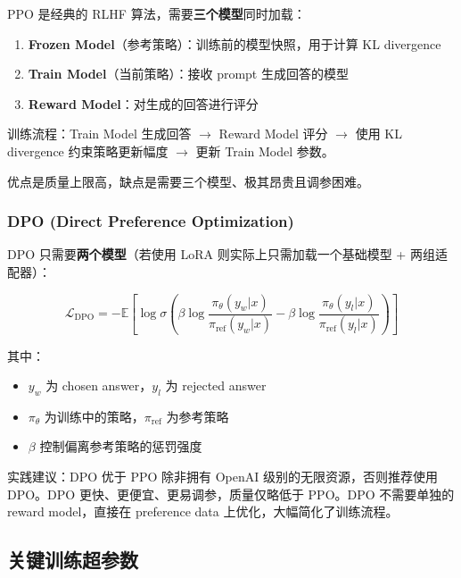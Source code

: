 \documentclass[a4paper]{article}
\begin{document}
PPO 是经典的 RLHF 算法，需要\textbf{三个模型}同时加载：

\begin{enumerate}
    \item \textbf{Frozen Model}（参考策略）：训练前的模型快照，用于计算 KL divergence
    \item \textbf{Train Model}（当前策略）：接收 prompt 生成回答的模型
    \item \textbf{Reward Model}：对生成的回答进行评分
\end{enumerate}

训练流程：Train Model 生成回答 $\rightarrow$ Reward Model 评分 $\rightarrow$ 使用 KL divergence 约束策略更新幅度 $\rightarrow$ 更新 Train Model 参数。

优点是质量上限高，缺点是需要三个模型、极其昂贵且调参困难。

\subsubsection{DPO (Direct Preference Optimization)}

DPO 只需要\textbf{两个模型}（若使用 LoRA 则实际上只需加载一个基础模型 + 两组适配器）：

$$\mathcal{L}_{\text{DPO}} = -\mathbb{E}\left[\log \sigma\left(\beta \log \frac{\pi_\theta(y_w|x)}{\pi_{\text{ref}}(y_w|x)} - \beta \log \frac{\pi_\theta(y_l|x)}{\pi_{\text{ref}}(y_l|x)}\right)\right]$$

其中：
\begin{itemize}
    \item $y_w$ 为 chosen answer，$y_l$ 为 rejected answer
    \item $\pi_\theta$ 为训练中的策略，$\pi_{\text{ref}}$ 为参考策略
    \item $\beta$ 控制偏离参考策略的惩罚强度
\end{itemize}

\begin{importantbox}{实践建议：DPO 优于 PPO}
除非拥有 OpenAI 级别的无限资源，否则推荐使用 DPO。DPO 更快、更便宜、更易调参，质量仅略低于 PPO。DPO 不需要单独的 reward model，直接在 preference data 上优化，大幅简化了训练流程。
\end{importantbox}

\subsection{关键训练超参数}
\end{document}

